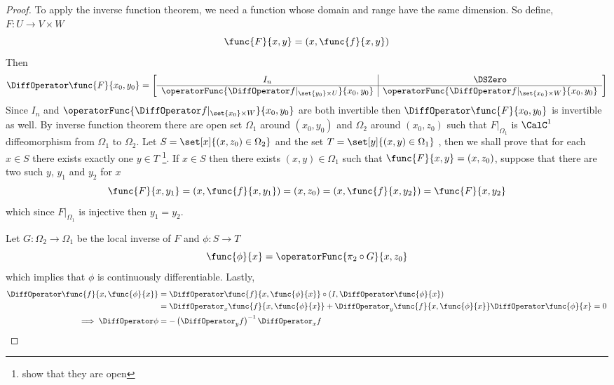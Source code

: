 \begin{proof}
    To apply the inverse function theorem, we need a function whose domain and range have the same dimension. So define, \(F: U \to V \times W\)
    \begin{equation*}
        \func{F}{x,y} = (x,\func{f}{x,y})
    \end{equation*}
    Then
    \begin{equation*}
        \DiffOperator \func{F}{x_0,y_0} = \left[\begin{array}{c|c}
                I_n                                                           & \DSZero                                                       \\ \hline
                \operatorFunc{\DiffOperator f|_{\set{y_0} \times U}}{x_0,y_0} & \operatorFunc{\DiffOperator f|_{\set{x_0} \times W}}{x_0,y_0}
            \end{array}\right]
    \end{equation*}
    Since \(I_n\) and \(\operatorFunc{\DiffOperator f|_{\set{x_0} \times W}}{x_0,y_0}\) are both invertible then \(\DiffOperator \func{F}{x_0,y_0}\) is invertible as well. By inverse function theorem there are open set \(\Omega_1\) around \((x_0,y_0)\) and \(\Omega_2\) around \((x_0,z_0)\) such that \(F|_{\Omega_1}\) is \(\CalC^1\) diffeomorphism from \(\Omega_1\) to \(\Omega_2\). Let \(S = \set[x]{(x,z_0) \in \Omega_2}\) and the set \(T = \set[y]{(x,y) \in \Omega_1}\) , then we shall prove that for each \(x \in S\) there exists exactly one \(y \in T\) \footnote{show that they are open}. If \(x \in S\) then there exists \((x,y) \in \Omega_1\) such that \(\func{F}{x,y} = (x,z_0)\), suppose that there are two such \(y\), \(y_1\) and \(y_2\) for \(x\)
    \begin{equation*}
        \func{F}{x,y_1} = (x,\func{f}{x,y_1}) = (x,z_0) = (x,\func{f}{x,y_2}) = \func{F}{x,y_2}
    \end{equation*}
    which since \(F|_{\Omega_1}\) is injective then \(y_1 = y_2\).

    Let \(G: \Omega_2 \to \Omega_1\) be the local inverse of \(F\) and \(\phi : S \to T\)
    \begin{equation*}
        \func{\phi}{x} = \operatorFunc{ \pi_2 \circ G}{x,z_0}
    \end{equation*}
    which implies that \(\phi\) is continuously differentiable. Lastly,
    \begin{align*}
        \DiffOperator \func{f}{x,\func{\phi}{x}} & = \DiffOperator \func{f}{x,\func{\phi}{x}} \circ (I, \DiffOperator \func{\phi}{x})                                         \\
                                                 & = \DiffOperator_x \func{f}{x,\func{\phi}{x}} + \DiffOperator_y  \func{f}{x,\func{\phi}{x}}\DiffOperator \func{\phi}{x} = 0 \\
        \implies  \DiffOperator \phi             & = - \left(\DiffOperator_y f\right)^{-1} \DiffOperator_x f
    \end{align*}
\end{proof}



